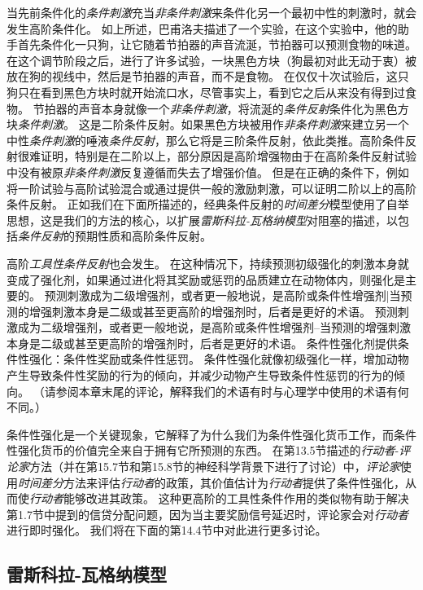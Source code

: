 当先前条件化的\textit{条件刺激}充当\textit{非条件刺激}来条件化另一个最初中性的刺激时，就会发生高阶条件化。
如上所述，巴甫洛夫描述了一个实验，在这个实验中，他的助手首先条件化一只狗，让它随着节拍器的声音流涎，节拍器可以预测食物的味道。
在这个调节阶段之后，进行了许多试验，一块黑色方块（狗最初对此无动于衷）被放在狗的视线中，然后是节拍器的声音，而不是食物。
在仅仅十次试验后，这只狗只在看到黑色方块时就开始流口水，尽管事实上，看到它之后从来没有得到过食物。
节拍器的声音本身就像一个\textit{非条件刺激}，将流涎的\textit{条件反射}条件化为黑色方块\textit{条件刺激}。
这是二阶条件反射。如果黑色方块被用作\textit{非条件刺激}来建立另一个中性\textit{条件刺激}的唾液\textit{条件反射}，那么它将是三阶条件反射，依此类推。高阶条件反射很难证明，特别是在二阶以上，部分原因是高阶增强物由于在高阶条件反射试验中没有被原\textit{非条件刺激}反复遵循而失去了增强价值。
但是在正确的条件下，例如将一阶试验与高阶试验混合或通过提供一般的激励刺激，可以证明二阶以上的高阶条件反射。
正如我们在下面所描述的，经典条件反射的\textit{时间差分}模型使用了自举思想，这是我们的方法的核心，以扩展\textit{雷斯科拉-瓦格纳模型}对阻塞的描述，以包括\textit{条件反射}的预期性质和高阶条件反射。
	
	
高阶\textit{工具性条件反射}也会发生。
在这种情况下，持续预测初级强化的刺激本身就变成了强化剂，如果通过进化将其奖励或惩罚的品质建立在动物体内，则强化是主要的。
预测刺激成为二级增强剂，或者更一般地说，是高阶或条件性增强剂|当预测的增强刺激本身是二级或甚至更高阶的增强剂时，后者是更好的术语。
预测刺激成为二级增强剂，或者更一般地说，是高阶或条件性增强剂--当预测的增强刺激本身是二级或甚至更高阶的增强剂时，后者是更好的术语。
条件性强化剂提供条件性强化：条件性奖励或条件性惩罚。
条件性强化就像初级强化一样，增加动物产生导致条件性奖励的行为的倾向，并减少动物产生导致条件性惩罚的行为的倾向。
（请参阅本章末尾的评论，解释我们的术语有时与心理学中使用的术语有何不同。）



条件性强化是一个关键现象，它解释了为什么我们为条件性强化货币工作，而条件性强化货币的价值完全来自于拥有它所预测的东西。
在第13.5节描述的\textit{行动者}-\textit{评论家}方法（并在第15.7节和第15.8节的神经科学背景下进行了讨论）中，\textit{评论家}使用\textit{时间差分}方法来评估\textit{行动者}的政策，其价值估计为\textit{行动者}提供了条件性强化，从而使\textit{行动者}能够改进其政策。
这种更高阶的工具性条件作用的类似物有助于解决第1.7节中提到的信贷分配问题，因为当主要奖励信号延迟时，评论家会对\textit{行动者}进行即时强化。
我们将在下面的第14.4节中对此进行更多讨论。


\subsection{雷斯科拉-瓦格纳模型} \label{sec:rescorla_wagner}

